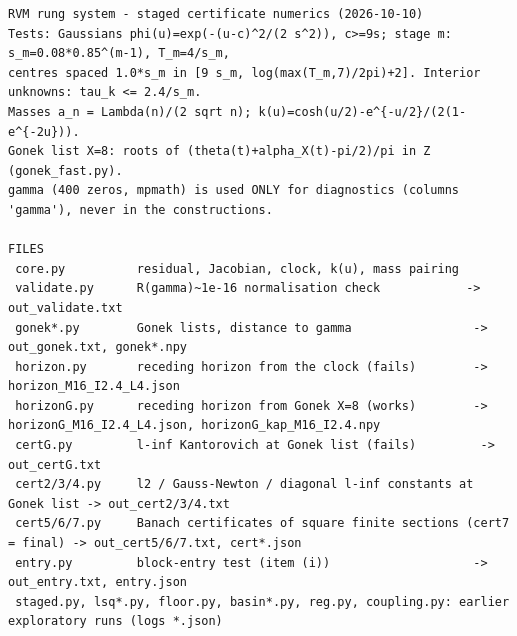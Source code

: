 \documentclass[11pt,reqno]{amsart}
\numberwithin{equation}{section}
\theoremstyle{plain}
\theoremstyle{definition}
\theoremstyle{remark}
\begin{document}
\begin{lstlisting}[style=out]
RVM rung system - staged certificate numerics (2026-10-10)
Tests: Gaussians phi(u)=exp(-(u-c)^2/(2 s^2)), c>=9s; stage m: s_m=0.08*0.85^(m-1), T_m=4/s_m,
centres spaced 1.0*s_m in [9 s_m, log(max(T_m,7)/2pi)+2]. Interior unknowns: tau_k <= 2.4/s_m.
Masses a_n = Lambda(n)/(2 sqrt n); k(u)=cosh(u/2)-e^{-u/2}/(2(1-e^{-2u})).
Gonek list X=8: roots of (theta(t)+alpha_X(t)-pi/2)/pi in Z (gonek_fast.py).
gamma (400 zeros, mpmath) is used ONLY for diagnostics (columns 'gamma'), never in the constructions.

FILES
 core.py          residual, Jacobian, clock, k(u), mass pairing
 validate.py      R(gamma)~1e-16 normalisation check            -> out_validate.txt
 gonek*.py        Gonek lists, distance to gamma                 -> out_gonek.txt, gonek*.npy
 horizon.py       receding horizon from the clock (fails)        -> horizon_M16_I2.4_L4.json
 horizonG.py      receding horizon from Gonek X=8 (works)        -> horizonG_M16_I2.4_L4.json, horizonG_kap_M16_I2.4.npy
 certG.py         l-inf Kantorovich at Gonek list (fails)         -> out_certG.txt
 cert2/3/4.py     l2 / Gauss-Newton / diagonal l-inf constants at Gonek list -> out_cert2/3/4.txt
 cert5/6/7.py     Banach certificates of square finite sections (cert7 = final) -> out_cert5/6/7.txt, cert*.json
 entry.py         block-entry test (item (i))                    -> out_entry.txt, entry.json
 staged.py, lsq*.py, floor.py, basin*.py, reg.py, coupling.py: earlier exploratory runs (logs *.json)


\end{lstlisting}
\end{document}

